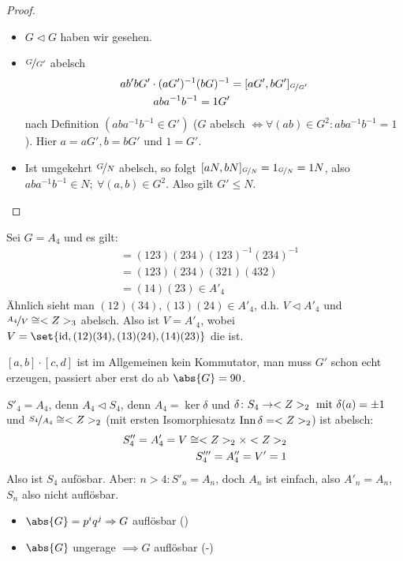 \begin{proof}
	\begin{itemize}
		\item $G \lhd G$ haben wir gesehen.
		\item $\lnkset{G}{G'}$ abelsch
		\begin{align*}
			ab' bG'\cdot (aG')^{-1}(bG)^{-1} &= [aG',bG']_{\lnkset{G}{G'}}\\
			aba^{-1}b^{-1} = 1G'
		\end{align*}
		nach Definition $(aba^{-1}b^{-1} \in G')$ ($G$ abelsch $\Leftrightarrow \forall (ab) \in G^2\colon aba^{-1}b^{-1} = 1$). Hier $a = aG', b = bG'$ und $1 = G'$.
		\item Ist umgekehrt $\lnkset{G}{N}$ abelsch, so folgt $[aN, bN]_{\lnkset{G}{N}} = 1_{\lnkset{G}{N}} = 1N$, also $aba^{-1}b^{-1} \in N;\ \forall (a,b) \in G^2$. Also gilt $G' \le N$.
	\end{itemize}
\end{proof}
\begin{*example}
	Sei $G = A_4$ und es gilt:
	\begin{align*}
		[(123),(234)] &= (123)(234)(123)^{-1}(234)^{-1}\\
		&= (123)(234)(321)(432)\\
		&= (14)(23)\in A'_4
	\end{align*}
	Ähnlich sieht man $(12)(34), (13)(24) \in A'_4$, d.h. $V \lhd A'_4$ und $\lnkset{A_4}{V} \cong \Z_3$ abelsch. Also ist $V = A'_4$, wobei $V = \set{\id, (12)(34),(13)(24),(14)(23)}$ die  ist.
\end{*example}
\begin{*remark}
	$[a,b]\cdot [c,d]$ ist im Allgemeinen kein Kommutator, man muss $G'$ schon echt erzeugen, passiert aber erst do ab $\abs{G} = 90$.
\end{*remark}
\begin{*example}
	$S'_4 = A_4$, denn $A_4 \lhd S_4$, denn $A_4 = \ker \delta$ und $\delta\colon S_4 \to <Z>_2 \text{ mit } \delta(a) = \pm 1$ und $\lnkset{S_4}{A_4} \cong \Z_2$ (mit ersten Isomorphiesatz $\operatorname{Inn} \delta = <Z>_2$) ist abelsch:
	\begin{align*}
		S''_4 = A'_4 = V \cong <Z>_2 \times <Z>_2\\
		S'''_4 = A''_4 = V' = 1
	\end{align*}
	Also ist $S_4$ aufösbar. Aber: $n > 4\colon S'_n = A_n$, doch $A_n$ ist einfach, also $A'_n = A_n$, $S_n$ also nicht auflösbar.
\end{*example}
\begin{*remark}
	\begin{itemize}
		\item $\abs{G} = p^i q^j \implies G$ auflösbar ()
		\item $\abs{G}$ ungerage $\implies G$ auflösbar (-)
	\end{itemize}
\end{*remark}
